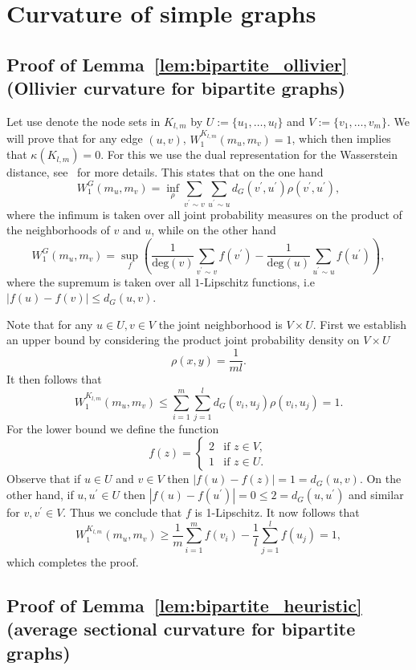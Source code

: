 \documentclass{article} %
\begin{document}
\section{Curvature of simple graphs}

\subsection{Proof of Lemma~\ref{lem:bipartite_ollivier} (Ollivier curvature for bipartite graphs)}\label{app:bipartite_ollivier}

Let use denote the node sets in $K_{l,m}$ by $U := \{u_1, \dots, u_l\}$ and $V := \{v_1, \dots, v_m\}$. We will prove that for any edge $(u, v)$, $W_1^{K_{l,m}}(m_{u},m_{v}) = 1$, which then implies that $\kappa(K_{l,m}) = 0$. For this we use the dual representation for the Wasserstein distance, see~\cite{ollivier2009ricci} for more details. This states that on the one hand
\[
	W^{G}_1(m_u,m_v) = \inf_{\rho} \sum_{v^\prime \sim v} \sum_{u^\prime \sim u} d_G(v^\prime, u^\prime) \rho(v^\prime, u^\prime),
\]
where the infimum is taken over all joint probability measures on the product of the neighborhoods of $v$ and $u$, while on the other hand
\[
	W^{G}_1(m_u,m_v) = \sup_{f} \left( \frac{1}{\mathrm{deg}(v) }\sum_{v^\prime \sim v} f(v^\prime) - \frac{1}{\mathrm{deg}(u) }\sum_{u^\prime \sim u} f(u^\prime)\right),
\]
where the supremum is taken over all $1$-Lipschitz functions, i.e $|f(u) - f(v)| \le d_G(u,v)$.

Note that for any $u \in U, v \in V$ the joint neighborhood is $V \times U$. First we establish an upper bound by considering the product joint probability density on $V \times U$
\[
	\rho(x,y) =	\frac{1}{m l}.
\]
It then follows that
\[
	W_1^{K_{l,m}}(m_{u},m_{v}) \le \sum_{i = 1}^m \sum_{j = 1}^l d_G(v_i, u_j) \rho(v_i, u_j)
	= 1.
\]
For the lower bound we define the function
\[
	f(z) = \begin{cases}
		2 &\mbox{if } z \in V,\\
		1 &\mbox{if } z \in U.
	\end{cases}
\]
Observe that if $u \in U$ and $v \in V$ then $|f(u) - f(z)| = 1 = d_G(u,v)$. On the other hand, if $u, u^\prime \in U$ then $|f(u) - f(u^\prime)| = 0 \le 2 = d_G(u,u^\prime)$ and similar for $v, v^\prime \in V$. Thus we conclude that $f$ is 1-Lipschitz. It now follows that
\[
	W_1^{K_{l,m}}(m_u,m_v) \ge \frac{1}{m} \sum_{i = 1}^m f(v_i) - \frac{1}{l} \sum_{j = 1}^l f(u_j) = 1,
\]
which completes the proof.

\subsection{Proof of Lemma~\ref{lem:bipartite_heuristic} (average sectional curvature for bipartite graphs)}\label{app:bipartite_heuristic}
\end{document}
